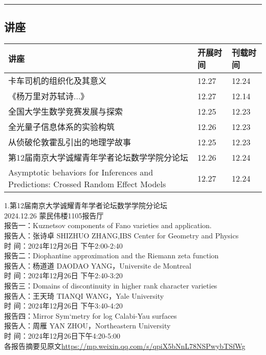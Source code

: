 \documentclass[letterpaper, 12pt]{article}
\begin{document}
\hrule
\pagebreak
\begin{multicols}{2}

\section{讲座}
\begin{tabularx}{0.5\textwidth}{|X|X|X|}
    \hline
    讲座 & 开展时间 & 刊载时间\\
   \hline\hline
卡车司机的组织化及其意义 & 12.27 & 12.24\\\hline
《杨万里对苏轼诗...》 & 12.27 & 12.14\\\hline
全国大学生数学竞赛发展与探索 & 12.25 & 12.23\\\hline
全光量子信息体系的实验构筑 & 12.26 & 12.23\\\hline
从侦破伦敦霍乱引出的地理学故事 & 12.25 & 12.23\\\hline
第12届南京大学诚耀青年学者论坛数学学院分论坛 & 12.26 & 12.24\\\hline
Asymptotic behaviors for Inferences and Predictions: Crossed Random Effect Models & 12.27 & 12.24\\\hline
\end{tabularx}

1.第12届南京大学诚耀青年学者论坛数学学院分论坛\\
2024.12.26 蒙民伟楼1105报告厅\\
报告一：Kuznetsov components of Fano varieties and application.\\
报告人：张诗卓 SHIZHUO ZHANG,IBS Center for Geometry and Physics\\
时 间：2024年12月26日 下午2:00-2:40\\
报告二：Diophantine approximation and the Riemann zeta function\\
报告人：杨道道 DAODAO YANG，Universite de Montreal\\
时 间：2024年12月26日 下午2:40-3:20\\
报告三：Domains of discontinuity in higher rank character varieties\\
报告人：王天琦 TIANQI WANG，Yale University\\
时 间：2024年12月26日 下午3:40-4:20\\
报告四：Mirror Sym`metry for log Calabi-Yau surfaces\\
报告人：周雁 YAN ZHOU，Northeastern University\\
时 间：2024年12月26日下午4:20-5:00\\
各报告摘要见原文\url{https://mp.weixin.qq.com/s/qpiX5bNnL78NSPwybTSfWg}\\



\end{multicols}
\end{document}

